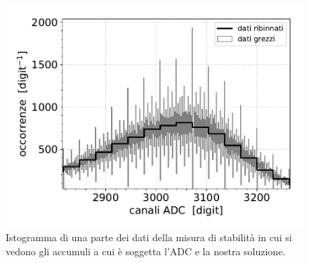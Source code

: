 \begin{figure}[h]
\centering
\includegraphics[width=30 em]{immagini/rebin}
\caption{Istogramma di una parte dei dati della misura di stabilità in cui si vedono gli accumuli a cui è soggetta l'ADC e la nostra soluzione.}
\label{picchi}
\end{figure}
